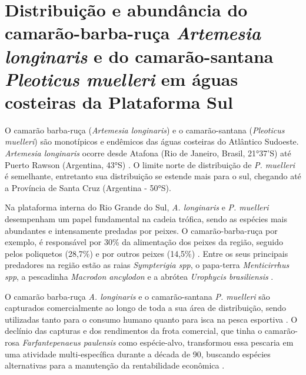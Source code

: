 \documentclass[a4paper,11pt,twoside,showtrims,onecolumn,openright,final]{memoir}
\begin{document}


% 
% 

\chapter[Distribuição e abundância de camarões em águas costeiras \newline da Plataforma Sul]
        {Distribuição e abundância do
         camarão-barba-ruça \emph{Artemesia longinaris} e do 
         camarão-santana \emph{Pleoticus muelleri} em águas costeiras da Plataforma Sul}\label{chap:crustaceos}



\newpage

O camarão barba-ruça (\emph{Artemesia longinaris}) e o camarão-santana (\emph{Pleoticus muelleri}) 
são monotípicos e endêmicos das águas costeiras do Atlântico Sudoeste.  
\emph{Artemesia longinaris} ocorre desde Atafona (Rio de Janeiro, Brasil, 21°37'S) 
até Puerto Rawson (Argentina, 43°S) \citep{dincao1999}.
O limite norte de distribuição de \emph{P. muelleri} é semelhante, entretanto 
sua distribuição se estende mais para o sul, 
chegando até a Província de Santa Cruz (Argentina - 50°S).

Na plataforma interna do Rio Grande do Sul, \emph{A. longinaris} e \emph{P. muelleri} desempenham 
um papel fundamental na cadeia trófica, sendo as espécies mais abundantes e intensamente 
predadas por peixes. O camarão-barba-ruça por exemplo, é responsável por 30\% da alimentação 
dos peixes da região, seguido pelos poliquetos (28,7\%) e por outros peixes (14,5\%) \citep{capitoli1994}.
Entre os seus principais predadores na região estão 
as raias \emph{Sympterigia spp}, o papa-terra \emph{Menticirrhus spp}, 
a pescadinha \emph{Macrodon ancylodon} e a abrótea \emph{Urophycis brasiliensis}
\citep{queiroz1986,capitoli1994}.

O camarão barba-ruça \emph{A. longinaris} e o camarão-santana \emph{P. muelleri} são capturados 
comercialmente ao longo de toda a sua área de distribuição, sendo utilizadas tanto para 
o consumo humano quanto para isca na pesca esportiva \citep{boschi1969}.
O declínio das capturas e dos rendimentos da frota comercial, que tinha o 
camarão-rosa \emph{Farfantepenaeus paulensis} como espécie-alvo, transformou essa pescaria 
em uma atividade multi-específica durante a década de 90, buscando espécies alternativas 
para a manutenção da rentabilidade econômica \citep{valentini1991b,dincao2002}.
\end{document}
